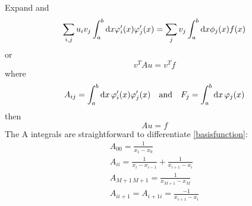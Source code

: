 Expand  and 
\begin{equation}
	\sum_{i, j} u_i v_j \int_a^b \dif x \varphi'_i(x) \varphi'_j(x) = \sum_j v_j \int_a^b \dif x \phi_j(x) f(x)
\end{equation}
or
\begin{equation}
	v^T A u = v^T f
\end{equation}
where
\begin{equation}
	A_{ij} = \integral{\varphi'_i(x) \varphi'_j(x)}{x}{a}{b} 
	\quad \text{and} \quad
	F_j = \integral{\varphi_j(x)}{x}{a}{b}
\end{equation}
then
\begin{equation}
	A u = f
\end{equation}
The A integrals are straightforward to differentiate \ref{basisfunction}:
\begin{equation}
\begin{split}
	A_{00} = \frac{1}{x_1 - x_0} \\
	A_{ii} = \frac{1}{x_i - x_{i-1}} + \frac{1}{x_{i+1}-x_i} \\
	A_{M+1 \, M+1} = \frac{1}{x_{M+1}-x_M} \\
	A_{i i+1} = A_{i+1 i} = \frac{-1}{x_{i+1} - x_i}
\end{split}
\end{equation}
